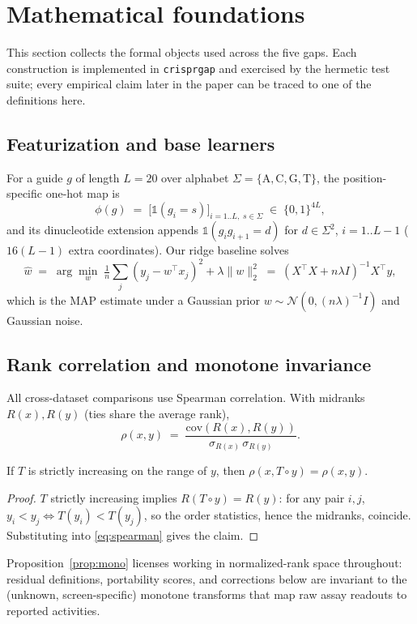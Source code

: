 \section{Mathematical foundations}
\label{sec:math}
This section collects the formal objects used across the five gaps.
Each construction is implemented in \texttt{crisprgap} and exercised by
the hermetic test suite; every empirical claim later in the paper can be
traced to one of the definitions here.

\subsection{Featurization and base learners}
For a guide $g$ of length $L=20$ over alphabet
$\Sigma=\{\mathrm{A,C,G,T}\}$, the position-specific one-hot map is
\begin{equation}
\phi(g) \;=\; \big[\mathbb{1}(g_i = s)\big]_{i=1..L,\; s \in \Sigma}
\;\in\; \{0,1\}^{4L},
\label{eq:onehot}
\end{equation}
and its dinucleotide extension appends
$\mathbb{1}(g_i g_{i+1} = d)$ for $d \in \Sigma^2$, $i=1..L-1$
($16(L-1)$ extra coordinates). Our ridge baseline solves
\begin{equation}
\hat w \;=\; \arg\min_w \; \tfrac{1}{n}\textstyle\sum_j (y_j - w^\top x_j)^2
+ \lambda \|w\|_2^2
\;=\; (X^\top X + n\lambda I)^{-1} X^\top y,
\label{eq:ridge}
\end{equation}
which is the MAP estimate under a Gaussian prior
$w \sim \mathcal N(0, (n\lambda)^{-1} I)$ and Gaussian noise.

\subsection{Rank correlation and monotone invariance}
All cross-dataset comparisons use Spearman correlation. With midranks
$R(x), R(y)$ (ties share the average rank),
\begin{equation}
\rho(x, y) \;=\;
\frac{\mathrm{cov}(R(x), R(y))}{\sigma_{R(x)}\, \sigma_{R(y)}}.
\label{eq:spearman}
\end{equation}
\begin{proposition}
\label{prop:mono}
If $T$ is strictly increasing on the range of $y$, then
$\rho(x, T \circ y) = \rho(x, y)$.
\end{proposition}
\begin{proof}
$T$ strictly increasing implies $R(T \circ y) = R(y)$: for any pair
$i, j$, $y_i < y_j \iff T(y_i) < T(y_j)$, so the order statistics, hence
the midranks, coincide. Substituting into \eqref{eq:spearman} gives the
claim.
\end{proof}
Proposition~\ref{prop:mono} licenses working in normalized-rank space
throughout: residual definitions, portability scores, and corrections
below are invariant to the (unknown, screen-specific) monotone transforms
that map raw assay readouts to reported activities.

